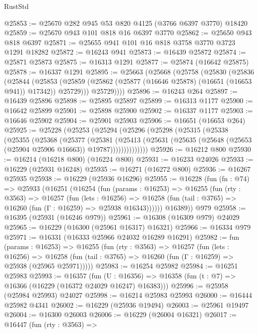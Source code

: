 \begin{lexlean}{RustStd}
\begin{coremodule}
@25853 := @25670 @282 @945 @53 @820 @4125 (@3766 @6397 @3770) @18420
@25859 := @25670 @943 @101 @818 @16 @6397 @3770
@25862 := @25650 @943 @818 @6397
@25871 := @25655 @941 @101 @16 @818 @3758 @3770 @3723 @1291 @18282
@25872 := @16243 @941
@25873 := @16439 @25872
@25874 := @25871 @25873
@25875 := @16313 @1291
@25877 := @25874 (@16642 @25875)
@25878 := @16337 @1291
@25895 := @25663
    (@25668
      (@25758
        (@25830
          (@25836
            (@25844
              (@25853
                (@25859 (@25862 (@25877 (@16646 @25878) (@16651 (@16653 @941)) @17342)) @25729)))
            @25729))))
@25896 := @16243 @264
@25897 := @16439 @25896
@25898 := @25895 @25897
@25899 := @16313 @1177
@25900 := @16642 @25899
@25901 := @25898 @25900
@25902 := @16337 @1177
@25903 := @16646 @25902
@25904 := @25901 @25903
@25906 := @16651 (@16653 @264)
@25925 := @25228
    (@25253
      (@25294
        (@25296
          (@25298
            (@25315
              (@25338
                (@25355
                  (@25368
                    (@25377
                      (@25381
                        (@25413
                          (@25631
                            (@25635 (@25648 (@25653 (@25904 @25906 @16663)) @19787))))))))))))))
@25926 := @16212 @800
@25930 := @16214 (@16218 @800) (@16224 @800)
@25931 := @16233 @24026
@25933 := @16229 (@25931 @16248)
@25935 := @16271 (@16272 @800)
@25936 := @16267 @25935
@25938 := @16229 (@25936 @16296)
@25955 := @16228
    (fun (fn : @74) =>
    @25933
      (@16251
        (@16254
          (fun (params : @16253) =>
          @16255
            (fun (rty : @3563) =>
            @16257
              (fun (lets : @16256) =>
              @16258 (fun (tail : @3765) => @16260 (fun (Γ : @16259) => @25938 @16343))))))
        @16389))
    @979
@25958 := @16395 (@25931 (@16246 @979))
@25961 := @16308 (@16309 @979) @24029
@25965 := @16229 (@16300 (@25961 @16317) @16321)
@25966 := @16334 @979
@25971 := @16331 (@16333 @25966 @24032 @16289 @16291)
@25982 := fun (params : @16253) =>
  @16255
    (fun (rty : @3563) =>
    @16257
      (fun (lets : @16256) =>
      @16258 (fun (tail : @3765) => @16260 (fun (Γ : @16259) => @25938 (@25965 @25971)))))
@25983 := @16254 @25982
@25984 := @16251 @25983
@25993 := @16357
    (fun (U : @16356) => @16358 (fun (t : @7) => @16366 (@16229 (@16372 @24029 @16247) @16383)))
@25996 := @25958 (@25984 @25993) @24027
@25998 := @16214 @25983 @25993
@26000 := @16444 @25982 @4341
@26002 := @16229 (@25936 @19494)
@26003 := @25961 @19497
@26004 := @16300 @26003
@26006 := @16229 (@26004 @16321)
@26017 := @16447
    (fun (rty : @3563) =>

\end{coremodule}
\end{lexlean}
